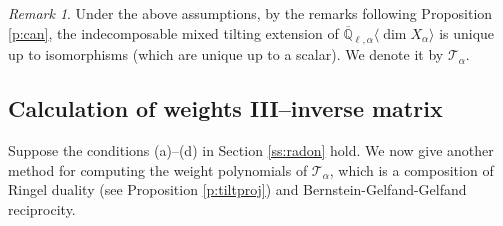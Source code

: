 \documentclass{amsart}
\theoremstyle{plain}
\theoremstyle{definition}
\theoremstyle{remark}
\newtheorem*{remark}{Remark}
\numberwithin{equation}{subsection}
\begin{document}
\begin{remark}
Under the above assumptions, by the remarks following Proposition \ref{p:can}, the indecomposable mixed tilting extension of ${\overline{\mathbb{Q}}_{\ell,\alpha}{\langle{{\dim X_\alpha}}\rangle}}$ is unique up to isomorphisms (which are unique up to a scalar). We denote it by ${\mathcal{T}}_\alpha$.
\end{remark}

\subsection{Calculation of weights III--inverse matrix}\label{ss:cal2}
Suppose the conditions (a)--(d) in Section \ref{ss:radon} hold. We now give another method for computing the weight polynomials of ${\mathcal{T}}_\alpha$, which is a composition of Ringel duality (see Proposition \ref{p:tiltproj}) and Bernstein-Gelfand-Gelfand reciprocity.
\end{document}
